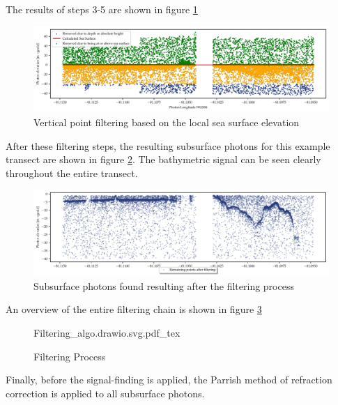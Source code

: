 \begin{enumerate}
    
    The results of steps 3-5  are shown in figure \ref{fig:vert_filtering}
    \begin{figure}[h]
        \centering
        \includegraphics[width=\textwidth]{figures/methodology_sealvl_filtering.pdf}
        \caption{Vertical point filtering based on the local sea surface elevation}
        \label{fig:vert_filtering}
    \end{figure}
\end{enumerate}

After these filtering steps, the resulting subsurface photons for this example transect are shown in figure \ref{fig:remaing_photons}. The bathymetric signal can be seen clearly throughout the entire transect.

\begin{figure}[h]
    \centering
    \includegraphics[width=\textwidth]{figures/methodology_reminaing_after_filtering.pdf}
    \caption{Subsurface photons found resulting after the filtering process}
    \label{fig:remaing_photons}
\end{figure}

An overview of the entire filtering chain is shown in figure \ref{fig:filtering-flowchart}

\begin{figure}[h]
    \centering
    {Filtering_algo.drawio.svg.pdf_tex}
    \caption{Filtering Process}
    \label{fig:filtering-flowchart}
\end{figure}

Finally, before the signal-finding is applied, the Parrish method of refraction correction is applied to all subsurface photons.

